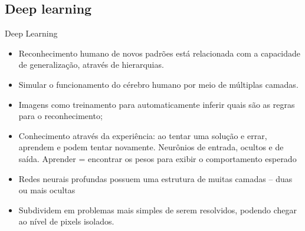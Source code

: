 \documentclass{beamer}
\begin{document}
\subsection{Deep learning}
\begin{frame}{Deep Learning}
\begin{itemize}
  \item Reconhecimento humano de novos padrões está relacionada com a capacidade de generalização, através de hierarquias.%
  \item Simular o funcionamento do cérebro humano por meio de múltiplas camadas.
  \item Imagens como treinamento para automaticamente inferir quais são as regras para o reconhecimento;
  \item Conhecimento através da experiência: ao tentar uma solução e errar, aprendem e podem tentar novamente. Neurônios de entrada, ocultos e de saída. Aprender = encontrar os pesos para exibir o comportamento esperado%
  \item Redes neurais profundas possuem uma estrutura de muitas camadas -- duas ou mais ocultas %
  \item Subdividem em problemas mais simples de serem resolvidos, podendo chegar ao nível de pixels isolados.
\end{itemize}



\begin{frame}{Deep Learning}
 \begin{figure}[hbpt]
 \begin{center}
   \texttt{[image: \\detokenize \{figuras/convnet.png]}}
 \end{center}
  \caption{}
\end{figure}
\end{itemize}



\end{frame}
\end{frame}
\end{document}
